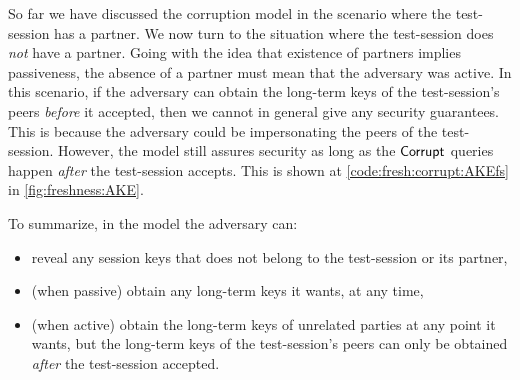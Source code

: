 So far we have discussed the \akefstext corruption model in the scenario where the test-session has a partner.
We now turn to the situation where the test-session does \emph{not} have a partner.
Going with the idea that existence of partners implies passiveness,
the absence of a partner must mean that the adversary was active. 
In this scenario,
if the adversary can obtain the long-term keys of the test-session's peers \emph{before} it accepted,
then we cannot in general give any security guarantees.
This is because the adversary could be impersonating the peers of the test-session.
However,
the \akefstext model still assures security as long as the $\mathsf{Corrupt}$ queries happen \emph{after} the test-session accepts.
This is shown at \cref{code:fresh:corrupt:AKEfs} in \cref{fig:freshness:AKE}.

To summarize,
in the \akefstext model the adversary can:
\begin{itemize}
	\item reveal any session keys that does not belong to the test-session or its partner,

	\item (when passive) obtain any long-term keys it wants,
	at any time,
	
	\item (when active) obtain the long-term keys of unrelated parties at any point it wants,
	but the long-term keys of the test-session's peers can only be obtained \emph{after} the test-session accepted.
\end{itemize}


